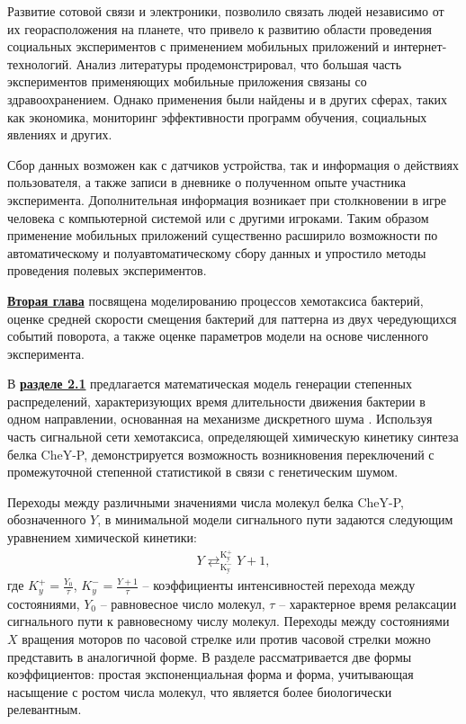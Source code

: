 Развитие сотовой связи и электроники, позволило связать людей независимо от их георасположения на планете, что привело к развитию области проведения социальных экспериментов с применением мобильных приложений и интернет-технологий. Анализ литературы продемонстрировал, что большая часть экспериментов применяющих мобильные приложения связаны со здравоохранением. Однако применения были найдены и в других сферах, таких как экономика, мониторинг эффективности программ обучения, социальных явлениях и других. 

Сбор данных возможен как с датчиков устройства, так и информация о действиях пользователя, а также записи в дневнике о полученном опыте участника эксперимента. Дополнительная информация возникает при столкновении в игре человека с компьютерной системой или с другими игроками. Таким образом применение мобильных приложений существенно расширило возможности по автоматическому и полуавтоматическому сбору данных и упростило методы проведения полевых экспериментов.

\underline{\textbf{Вторая глава}} посвящена моделированию процессов хемотаксиса бактерий, оценке средней скорости смещения бактерий для паттерна из двух чередующихся событий поворота, а также оценке параметров модели на основе численного эксперимента.

В \underline{\textbf{разделе 2.1}} предлагается математическая модель генерации степенных распределений, характеризующих время длительности движения бактерии в одном направлении, основанная на механизме дискретного шума \cite{bib1,confbib5}. Используя часть сигнальной сети хемотаксиса, определяющей химическую кинетику синтеза белка CheY-P, демонстрируется возможность возникновения переключений с промежуточной степенной статистикой в связи с генетическим шумом.

Переходы между различными значениями числа молекул белка CheY-P, обозначенного $Y$, в минимальной модели сигнального пути задаются следующим уравнением химической кинетики:
\begin{equation}
    \begin{aligned}
        Y \mathrel{\mathop{\rightleftarrows}^{\mathrm{K_{y}^{+}}}_{\mathrm{K_{y}^{-}}}} Y + 1,
    \label{eq:chem}
    \end{aligned}
\end{equation}
где $K_{y}^{+}=\frac{Y_0}{\tau}$, $K_{y}^{-}=\frac{Y+1}{\tau}$ -- коэффициенты интенсивностей перехода между состояниями, $Y_0$ -- равновесное число молекул, $\tau$ -- характерное время релаксации сигнального пути к равновесному числу молекул. Переходы между состояниями $X$ вращения моторов по часовой стрелке или против часовой стрелки можно представить в аналогичной форме. В разделе рассматривается две формы коэффициентов: простая экспоненциальная форма и форма, учитывающая насыщение с ростом числа молекул, что является более биологически релевантным.

